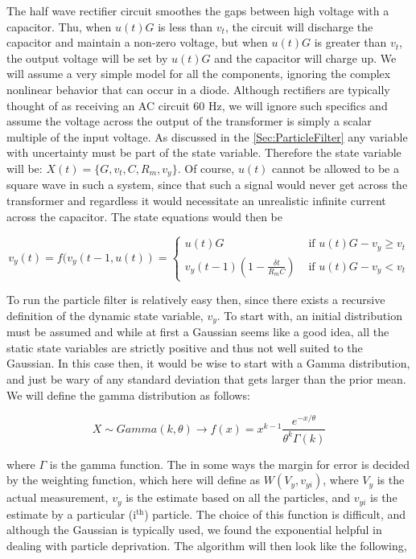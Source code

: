 \documentclass{article}
\begin{document}
The half wave rectifier circuit smoothes the gaps between high voltage
with a capacitor. Thu, when $u(t)G$ is less than $v_t$, the circuit will 
discharge the capacitor and maintain a non-zero voltage,
but when $u(t)G$ is greater than $v_t$, the output voltage will be set
by $u(t)G$ and the capacitor will charge up. We will assume a very simple
model for all the components, ignoring the complex nonlinear behavior
that can occur in a diode. Although rectifiers are typically thought
of as receiving an AC circuit 60 Hz, we will ignore such specifics and 
assume the voltage across the output of the transformer is simply a scalar
multiple of the input voltage.  As discussed in the \ref{Sec:ParticleFilter} any
variable with uncertainty must be part of the state variable. Therefore
the state variable will be: $X(t) = \{G, v_t, C, R_m, v_y\}$. Of course,
$u(t)$ cannot be allowed to be a square wave in such a system, since that
such a signal would never get across the transformer and regardless it
would necessitate an unrealistic infinite current across the capacitor.
The state equations would then be 

\begin{equation}
v_y(t)  = f(v_y(t-1, u(t)) =  \begin{cases} 
        u(t)G & \text{ if }  u(t)G-v_y \ge v_t\\
        v_y(t-1)\left(1 - \frac{\delta t}{R_mC}\right) & \text{ if }  u(t)G-v_y < v_t
    \end{cases} 
\end{equation}

To run the particle filter is relatively easy then, since there exists 
a recursive definition of the dynamic state variable, $v_y$. To start
with, an initial distribution must be assumed and while at first a 
Gaussian seems like a good idea, all the static state variables are strictly
positive and thus not well suited to the Gaussian. In this case then,
it would be wise to start with a Gamma distribution, and just be wary of
any standard deviation that gets larger than the prior mean. We will define
the gamma distribution as follows:

\begin{equation}
X \sim Gamma(k, \theta) \rightarrow f(x) = x^{k-1}\frac{e^{-x/\theta}}{\theta^k\Gamma(k)}
\end{equation}

where $\Gamma$ is the gamma function.
The in some ways the margin for error is decided by the weighting function, which
here will define as $W(V_y, v_{yi})$, where $V_y$ is the actual measurement, $v_y$ is the 
estimate based on all the particles, and 
$v_{yi}$ is the estimate by a particular (i$^{\text{th}}$) particle. The choice of this function is difficult,
and although the Gaussian is typically used, we found the exponential helpful
in dealing with particle deprivation.  The algorithm will then look like the following,
\end{document}
